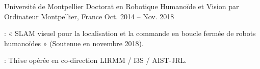 
\begin{cventries}

  \cventry
  {Université de Montpellier} %
  {Doctorat en Robotique Humanoïde et Vision par Ordinateur} %
  {Montpellier, France} %
  {Oct. 2014 -- Nov. 2018} %
  {
    \begin{cvitems}
    \item {} : « SLAM visuel pour la localisation et la commande en boucle fermée de
      robots humanoïdes » (Soutenue en novembre 2018).
    \item {} : Thèse opérée en co-direction LIRMM / I3S / AIST-JRL.
    \end{cvitems}
  }


\end{cventries}
